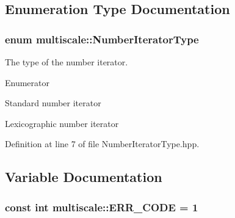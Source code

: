\subsection{Enumeration Type Documentation}
\hypertarget{namespacemultiscale_a6ef911f4d48a4bf5e657c237ec169ff5}{
\subsubsection[{Number\-Iterator\-Type}]{\setlength{\rightskip}{0pt plus 5cm}enum {\bf multiscale\-::\-Number\-Iterator\-Type}}}\label{namespacemultiscale_a6ef911f4d48a4bf5e657c237ec169ff5}


The type of the number iterator. 

\begin{Desc}
\item[Enumerator]\par
\begin{description}
\item[{\em 
\hypertarget{namespacemultiscale_a6ef911f4d48a4bf5e657c237ec169ff5aa048887eb0360a4b70dff5452133f42e}{S\-T\-A\-N\-D\-A\-R\-D}\label{namespacemultiscale_a6ef911f4d48a4bf5e657c237ec169ff5aa048887eb0360a4b70dff5452133f42e}
}]Standard number iterator \item[{\em 
\hypertarget{namespacemultiscale_a6ef911f4d48a4bf5e657c237ec169ff5a2cba3a0174cc5c1d555ee13dcf6cda15}{L\-E\-X\-I\-C\-O\-G\-R\-A\-P\-H\-I\-C}\label{namespacemultiscale_a6ef911f4d48a4bf5e657c237ec169ff5a2cba3a0174cc5c1d555ee13dcf6cda15}
}]Lexicographic number iterator \end{description}
\end{Desc}


Definition at line 7 of file Number\-Iterator\-Type.\-hpp.



\subsection{Variable Documentation}
\hypertarget{namespacemultiscale_a4ee40795105048ee371efeeb7962ecf6}{
\subsubsection[{E\-R\-R\-\_\-\-C\-O\-D\-E}]{\setlength{\rightskip}{0pt plus 5cm}const int multiscale\-::\-E\-R\-R\-\_\-\-C\-O\-D\-E = 1}}\label{namespacemultiscale_a4ee40795105048ee371efeeb7962ecf6}



